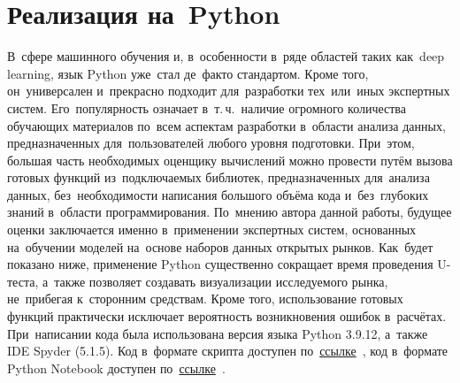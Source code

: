 \documentclass[]{scrreprt}
\begin{document}
\section{Реализация на~Python}\label{U-test-Python}
%
%
В~сфере машинного обучения и, в~особенности в~ряде областей таких как~\foreignlanguage{english}{deep learning}, язык Python уже~стал де~факто стандартом. Кроме того, он~универсален и~прекрасно подходит для~разработки тех~или~иных экспертных систем. Его~популярность означает в~т.\,ч.~наличие огромного количества обучающих материалов по~всем аспектам разработки в~области анализа данных, предназначенных для~пользователей любого уровня подготовки. При~этом, большая часть необходимых оценщику вычислений можно провести путём вызова готовых функций из~подключаемых библиотек, предназначенных для~анализа данных, без~необходимости написания большого объёма кода и~без~глубоких знаний в~области программирования. По~мнению автора данной работы, будущее оценки заключается именно в~применении экспертных систем, основанных на~обучении моделей на~основе наборов данных открытых рынков. Как~будет показано ниже, применение Python существенно сокращает время проведения U-теста, а~также позволяет создавать визуализации исследуемого рынка, не~прибегая к~сторонним средствам. Кроме того, использование готовых функций практически исключает вероятность возникновения ошибок в~расчётах. При~написании кода была использована версия языка Python 3.9.12, а~также IDE Spyder (5.1.5). Код в~формате скрипта доступен по~\href{https://github.com/Kirill-Murashev/AI_for_valuers_book/blob/main/Parts-Chapters/Mann-Whitney-Wilcoxon/U-test.py}{ссылке}~\cite{Murashev:U-test.py}, код в~формате \foreignlanguage{english}{Python Notebook}  доступен по~\href{https://github.com/Kirill-Murashev/AI_for_valuers_book/blob/main/Parts-Chapters/Mann-Whitney-Wilcoxon/U-test.ipynb}{ссылке}~\cite{Murashev:U-test.ipynb}.
\end{document}
